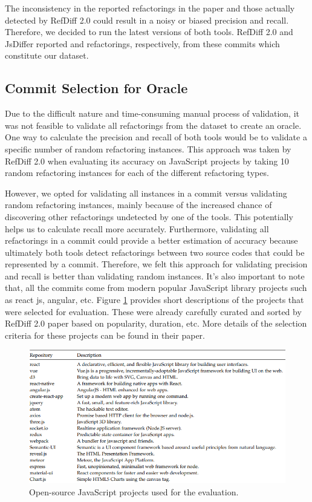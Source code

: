 \documentclass[letterpaper,12pt,onecolumn,final]{report}
\begin{document}
The inconsistency in the reported refactorings in the paper and those actually detected by RefDiff 2.0 could result in a noisy or biased precision and recall. Therefore, we decided to run the latest versions of both tools. RefDiff 2.0 and JsDiffer reported \evRefDiffToolTotalRefCount{} and \evJsDifferToolTotalRefCount{} refactorings, respectively, from these \evTotalCommits{} commits which constitute our dataset.

\subsection {Commit Selection for Oracle}
Due to the difficult nature and time-consuming manual process of validation, it was not feasible to validate all refactorings from the dataset to create an oracle. One way to calculate the precision and recall of both tools would be to validate a specific number of random refactoring instances. This approach was taken by RefDiff 2.0 when evaluating its accuracy on JavaScript projects by taking 10 random refactoring instances for each of the different refactoring types.

However, we opted for validating all instances in a commit versus validating random refactoring instances, mainly because of the increased chance of discovering other refactorings undetected by one of the tools. This potentially helps us to calculate recall more accurately. Furthermore, validating all refactorings in a commit could provide a better estimation of accuracy because ultimately both tools detect refactorings between two source codes that could be represented by a commit. Therefore, we felt this approach for validating precision and recall is better than validating random instances. It's also important to note that, all the commits come from modern popular JavaScript library projects such as react js, angular, etc.  Figure \ref{fig:projects} provides short descriptions of the projects that were selected for evaluation. These were already carefully curated and sorted by RefDiff 2.0 paper \cite{Silva2016}   based on popularity, duration, etc. More details of the selection criteria for these projects can be found in their paper.

\begin{figure}
\includegraphics[width=\textwidth,keepaspectratio]{images/projects.PNG}
  \caption{Open-source JavaScript projects used for the evaluation.}
   \label{fig:projects}
\end{figure} 
\end{document}
